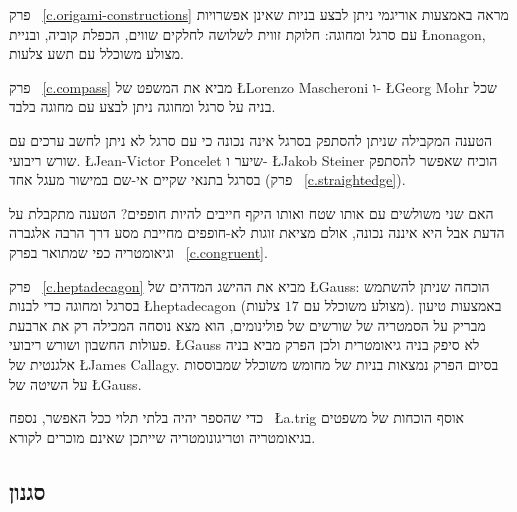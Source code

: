 פרק~%
\ref{c.origami-constructions}
מראה באמצעות אוריגמי ניתן לבצע בניות שאינן אפשרויות עם סרגל ומחוגה: חלוקת זווית לשלושה לחלקים שווים, הכפלת קוביה, ובניית 
\L{nonagon},
מצולע משוכלל עם תשע צלעות.


פרק~%
\ref{c.compass}
מביא את המשפט של 
\L{Lorenzo Mascheroni}
ו-%
\L{Georg Mohr} 
שכל בניה על סרגל ומחוגה ניתן לבצע עם מחוגה בלבד.

הטענה המקבילה שניתן להסתפק בסרגל אינה נכונה כי עם סרגל לא ניתן לחשב ערכים עם שורש ריבועי.
\L{Jean-Victor Poncelet}
שיער ו-%
\L{Jakob Steiner}
הוכיח שאפשר להסתפק בסרגל בתנאי שקיים אי-שם במישור מעגל אחד (פרק~%
\ref{c.straightedge}).


האם שני משולשים עם אותו שטח ואותו היקף חייבים להיות חופפים? הטענה מתקבלת על הדעת אבל היא איננה נכונה, אולם מציאת זוגות לא-חופפים מחייבת מסע דרך הרבה אלגברה וגיאומטריה כפי שמתואר בפרק~%
\ref{c.congruent}.


פרק~%
\ref{c.heptadecagon}
מביא את ההישג המדהים של 
\L{Gauss}:
הוכחה שניתן להשתמש בסרגל ומחוגה כדי לבנות 
\L{heptadecagon}
(מצולע משוכלל עם $17$ צלעות). באמצעות טיעון מבריק על הסמטריה של שורשים של פולינומים, הוא מצא נוסחה המכילה רק את ארבעת פעולות החשבון ושורש ריבועי. 
\L{Gauss}
לא סיפק בניה גיאומטרית ולכן הפרק מביא בניה אלגנטית של 
\L{James Callagy}.
בסיום הפרק נמצאות בניות של מחומש משוכלל שמבוססות על השיטה של
\L{Gauss}.



כדי שהספר יהיה בלתי תלוי ככל האפשר, נספח~%
\L{a.trig}
אוסף הוכחות של משפטים בגיאומטריה וטריגונומטריה שייתכן שאינם מוכרים לקורא.


\subsection*{סגנון}

